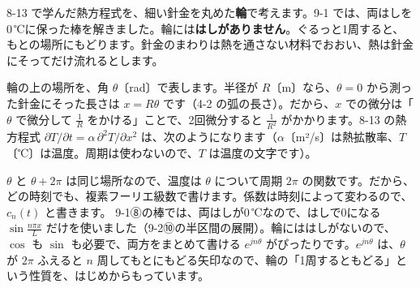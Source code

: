 
\label{bk:9-3:wa}8-13 で学んだ熱方程式を、細い針金を丸めた\textbf{輪}で考えます。9-1 では、両はしを0\,℃に保った棒を解きました。輪には\textbf{はしがありません}。ぐるっと1周すると、もとの場所にもどります。針金のまわりは熱を通さない材料でおおい、熱は針金にそってだけ流れるとします。


輪の上の場所を、角 $\theta$〔rad〕で表します。半径が $R$〔m〕なら、$\theta=0$ から測った針金にそった長さは $x=R\theta$ です（4-2 の弧の長さ）。だから、$x$ での微分は「$\theta$ で微分して $\frac1R$ をかける」ことで、2回微分すると $\frac{1}{R^2}$ がかかります。8-13 の熱方程式 $\partial T/\partial t=\alpha\,\partial^2T/\partial x^2$ は、次のようになります（$\alpha$〔m²/s〕は熱拡散率、$T$〔℃〕は温度。周期は使わないので、$T$ は温度の文字です）。

$\theta$ と $\theta+2\pi$ は同じ場所なので、温度は $\theta$ について周期 $2\pi$ の関数です。だから、どの時刻でも、複素フーリエ級数で書けます。係数は時刻によって変わるので、$c_n(t)$ と書きます。
9-1⑧の棒では、両はしが0\,℃なので、はしで0になる $\sin\frac{n\pi x}{L}$ だけを使いました（9-2⑩の半区間の展開）。輪にははしがないので、$\cos$ も $\sin$ も必要で、両方をまとめて書ける $e^{jn\theta}$ がぴったりです。$e^{jn\theta}$ は、$\theta$ が $2\pi$ ふえると $n$ 周してもとにもどる矢印なので、輪の「1周するともどる」という性質を、はじめからもっています。

